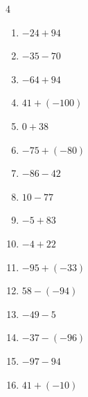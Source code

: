 \begin{multicols}{4}
\begin{enumerate}
  \item $-24+94$

        \phantom{$=70$}

  \item $-35-70$

        \phantom{$=-105$}

  \item $-64+94$

        \phantom{$=30$}

  \item $41+(-100)$

        \phantom{$=-59$}

  \item $0+38$

        \phantom{$=38$}

  \item $-75+(-80)$

        \phantom{$=-155$}

  \item $-86-42$

        \phantom{$=-128$}

  \item $10-77$

        \phantom{$=-67$}

\columnbreak %

  \item $-5+83$

        \phantom{$=78$}

  \item $-4+22$

        \phantom{$=18$}

  \item $-95+(-33)$

        \phantom{$=-128$}

  \item $58-(-94)$

        \phantom{$=152$}

  \item $-49-5$

        \phantom{$=-54$}

  \item $-37-(-96)$

        \phantom{$=59$}

  \item $-97-94$

        \phantom{$=-191$}

  \item $41+(-10)$


\end{enumerate}
\end{multicols}
